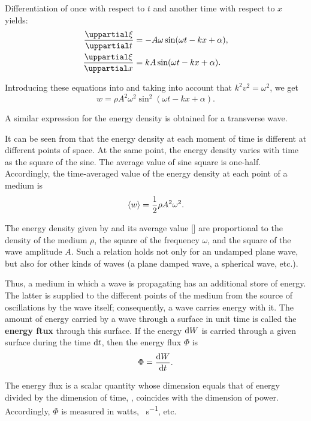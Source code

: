 Differentiation of  once with respect to $t$ and another time with respect to $x$ yields:
\begin{align*}
	\diffpartial{\xi}{t} &= - A\omega \sin(\omega t - kx + \alpha),\\
	\diffpartial{\xi}{x} &=  kA \sin(\omega t - kx + \alpha).
\end{align*}

\noindent
Introducing these equations into  and taking into account that $k^2v^2=\omega^2$, we get
\begin{equation}\label{eq:14_42}
	w = \rho A^2 \omega^2 \sin^2(\omega t - kx + \alpha).
\end{equation}

\noindent
A similar expression for the energy density is obtained for a transverse wave.

It can be seen from  that the energy density at each moment of time is different at different points of space.
At the same point, the energy density varies with time as the square of the sine.
The average value of sine square is one-half. Accordingly, the time-averaged value of the energy density at each point of a medium is
\begin{equation}\label{eq:14_43}
	\left\langle w \right\rangle = \frac{1}{2} \rho A^2 \omega^2.
\end{equation}

\noindent
The energy density given by  and its average value [] are proportional to the density of the medium $\rho$, the square of the frequency $\omega$, and the square of the wave amplitude $A$.
Such a relation holds not only for an undamped plane wave, but also for other kinds of waves (a plane damped wave, a spherical wave, etc.).

Thus, a medium in which a wave is propagating has an additional store of energy.
The latter is supplied to the different points of the medium from the source of oscillations by the wave itself; consequently, a wave carries energy with it.
The amount of energy carried by a wave through a surface in unit time is called the \textbf{energy ftux} through this surface.
If the energy $\mathrm{d} W$ is carried through a given
surface during the time $\mathrm{d} t$, then the energy flux $\Phi$ is
\begin{equation}\label{eq:14_44}
	\Phi = \dfrac{\mathrm{d} W}{\mathrm{d} t}.
\end{equation}

\noindent
The energy flux is a scalar quantity whose dimension equals that of energy divided by the dimension of time, \ie, coincides with the dimension of power.
Accordingly, $\Phi$ is measured in watts, \si{\erg\per\second}, etc.

